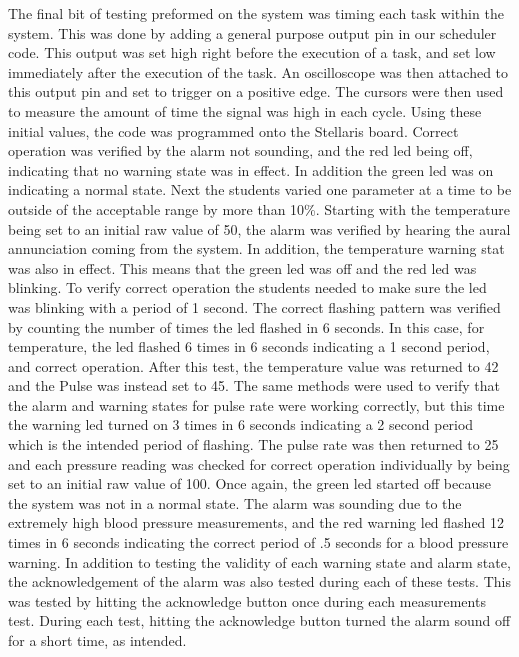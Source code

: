 \documentclass[12pt]{article} %
\begin{document}
    The final bit of testing preformed on the system was timing each task within
    the system. This was done by adding a general purpose output pin in our
    scheduler code. This output was set high right before the execution of a task,
    and set low immediately after the execution of the task. An oscilloscope was
    then attached to this output pin and set to trigger on a positive edge. The
    cursors were then used to measure the amount of time the signal was high in
    each cycle.
    Using these initial values, the code was programmed onto the Stellaris board.
    Correct operation was verified by the alarm not sounding, and the red led being
    off, indicating that no warning state was in effect. In addition the green led
    was on indicating a normal state. Next the students varied one parameter at a
    time to be outside of the acceptable range by more than 10\%. Starting with the
    temperature being set to an initial raw value of 50, the alarm was verified by
    hearing the aural annunciation coming from the system. In addition, the
    temperature warning stat was also in effect. This means that the green led was
    off and the red led was blinking. To verify correct operation the students
    needed to make sure the led was blinking with a period of 1 second. The correct
    flashing pattern was verified by counting the number of times the led flashed
    in 6 seconds. In this case, for temperature, the led flashed 6 times in 6
    seconds indicating a 1 second period, and correct operation. After this test,
    the temperature value was returned to 42 and the Pulse was instead set to 45.
    The same methods were used to verify that the alarm and warning states for
    pulse rate were working correctly, but this time the warning led turned on 3
    times in 6 seconds indicating a 2 second period which is the intended period of
    flashing. The pulse rate was then returned to 25 and each pressure reading was
    checked for correct operation individually by being set to an initial raw value
    of 100. Once again, the green led started off because the system was not in a
    normal state. The alarm was sounding due to the extremely high blood pressure
    measurements, and the red warning led flashed 12 times in 6 seconds indicating
    the correct period of .5 seconds for a blood pressure warning. In addition to
    testing the validity of each warning state and alarm state, the acknowledgement
    of the alarm was also tested during each of these tests. This was tested by
    hitting the acknowledge button once during each measurements test. During each
    test, hitting the acknowledge button turned the alarm sound off for a short
    time, as intended. 
\end{document}
